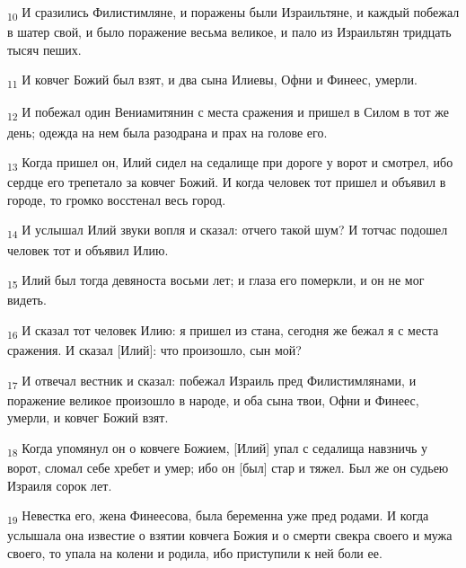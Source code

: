 \begin{tcolorbox}
\textsubscript{10} И сразились Филистимляне, и поражены были Израильтяне, и каждый побежал в шатер свой, и было поражение весьма великое, и пало из Израильтян тридцать тысяч пеших.
\end{tcolorbox}
\begin{tcolorbox}
\textsubscript{11} И ковчег Божий был взят, и два сына Илиевы, Офни и Финеес, умерли.
\end{tcolorbox}
\begin{tcolorbox}
\textsubscript{12} И побежал один Вениамитянин с места сражения и пришел в Силом в тот же день; одежда на нем была разодрана и прах на голове его.
\end{tcolorbox}
\begin{tcolorbox}
\textsubscript{13} Когда пришел он, Илий сидел на седалище при дороге у ворот и смотрел, ибо сердце его трепетало за ковчег Божий. И когда человек тот пришел и объявил в городе, то громко восстенал весь город.
\end{tcolorbox}
\begin{tcolorbox}
\textsubscript{14} И услышал Илий звуки вопля и сказал: отчего такой шум? И тотчас подошел человек тот и объявил Илию.
\end{tcolorbox}
\begin{tcolorbox}
\textsubscript{15} Илий был тогда девяноста восьми лет; и глаза его померкли, и он не мог видеть.
\end{tcolorbox}
\begin{tcolorbox}
\textsubscript{16} И сказал тот человек Илию: я пришел из стана, сегодня же бежал я с места сражения. И сказал [Илий]: что произошло, сын мой?
\end{tcolorbox}
\begin{tcolorbox}
\textsubscript{17} И отвечал вестник и сказал: побежал Израиль пред Филистимлянами, и поражение великое произошло в народе, и оба сына твои, Офни и Финеес, умерли, и ковчег Божий взят.
\end{tcolorbox}
\begin{tcolorbox}
\textsubscript{18} Когда упомянул он о ковчеге Божием, [Илий] упал с седалища навзничь у ворот, сломал себе хребет и умер; ибо он [был] стар и тяжел. Был же он судьею Израиля сорок лет.
\end{tcolorbox}
\begin{tcolorbox}
\textsubscript{19} Невестка его, жена Финеесова, была беременна уже пред родами. И когда услышала она известие о взятии ковчега Божия и о смерти свекра своего и мужа своего, то упала на колени и родила, ибо приступили к ней боли ее.
\end{tcolorbox}

